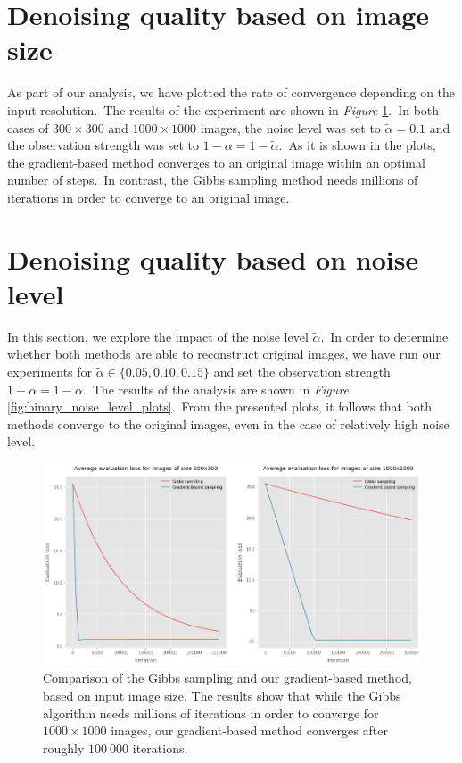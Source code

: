 \documentclass[a4paper, 11pt, onecolumn, openany, titlepage]{report}
\theoremstyle{default_theorem_style}\newtheorem{theorem}{Theorem}
\theoremstyle{default_theorem_style}\newtheorem{definition}{Definition}
\begin{document}
\section{Denoising quality based on image size}

As part of our analysis, we have plotted the rate of convergence depending on the input resolution.\ The
results of the experiment are shown in \textit{Figure} \ref{fig:binary_input_size_plots}.\ In
both cases of $300{\times}300$ and $1000{\times}1000$ images, the noise level was set to $\tilde{\alpha} = 0.1$
and the observation strength was set to $1 - \alpha = 1 - \tilde{\alpha}$.\ As it is shown in the plots,
the gradient-based method converges to an original image within an optimal number of steps.\ In contrast,
the Gibbs sampling method needs millions of iterations in order to converge to an original image.

\section{Denoising quality based on noise level}

In this section, we explore the impact of the noise level $\tilde{\alpha}$.\ In order to determine whether both
methods are able to reconstruct original images, we have run our experiments for
$\tilde{\alpha} \in \{0.05, 0.10, 0.15\}$ and set the observation strength $1 - \alpha = 1 - \tilde{\alpha}$.\ The
results of the analysis are shown in \textit{Figure} \ref{fig:binary_noise_level_plots}.\ From the presented
plots, it follows that both methods converge to the original images, even in the case of relatively high noise level.

\begin{figure}[H]
\centering
\includegraphics[scale=0.42]{binary_input_size_plots}
\caption{Comparison of the Gibbs sampling and our gradient-based method, based on input image size. The results
show that while the Gibbs algorithm needs millions of iterations in order to converge for $1000{\times}1000$ images, our
gradient-based method converges after roughly $100\ 000$ iterations.}
\label{fig:binary_input_size_plots}
\end{figure}
\end{document}
